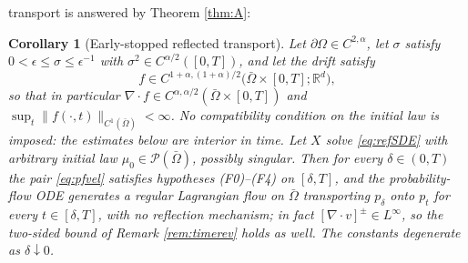 \documentclass[11pt]{amsart}
\newtheorem{corollary}[theorem]{Corollary}
\theoremstyle{definition}
\newcommand{\dive}{\nabla\!\cdot}
\newcommand{\R}{\mathbb{R}}
\newcommand{\PP}{\mathcal{P}}
\begin{document}
transport  is answered by Theorem \ref{thm:A}:
\begin{corollary}[Early-stopped reflected transport]\label{cor:early}
Let $\partial\Omega\in C^{2,\alpha}$, let $\sigma$ satisfy
$0<\epsilon\le\sigma\le\epsilon^{-1}$ with $\sigma^2\in
C^{\alpha/2}([0,T])$, and let the drift satisfy
\begin{equation}\label{eq:driftclass}
f\in C^{1+\alpha,(1+\alpha)/2}\big(\bar\Omega\times[0,T];\R^d\big),
\end{equation}
so that in particular $\dive f\in
C^{\alpha,\alpha/2}(\bar\Omega\times[0,T])$ and
$\sup_t\|f(\cdot,t)\|_{C^1(\bar\Omega)}<\infty$. No compatibility
condition on the initial law is imposed: the estimates below are
interior in time.
Let $X$ solve \eqref{eq:refSDE} with \emph{arbitrary} initial law
$\mu_0\in\PP(\bar\Omega)$, possibly singular. Then for every
$\delta\in(0,T)$ the pair \eqref{eq:pfvel} satisfies hypotheses
\textup{(F0)--(F4)} on $[\delta,T]$, and the probability-flow ODE
generates a regular Lagrangian flow on $\bar\Omega$ transporting
$p_\delta$ onto $p_t$ for every $t\in[\delta,T]$, with no reflection
mechanism; in fact $[\dive v]^\pm\in L^\infty$, so the two-sided
bound of Remark \ref{rem:timerev} holds as well. The constants
degenerate as $\delta\downarrow0$.
\end{corollary}
\end{document}

